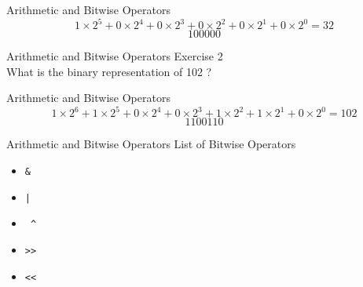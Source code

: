 \documentclass{beamer}
\begin{document}
    \begin{frame}{Arithmetic and Bitwise Operators}
        $$ 1 \times 2^5 + 0 \times 2^4 + 0 \times 2^3 + 0 \times 2^2 + 
        0 \times 2^1 + 0 \times 2^0 = 32 $$
        $$ 100000 $$
    \end{frame}
    
    \begin{frame}{Arithmetic and Bitwise Operators}
        \color{blue} \Large Exercise 2 \\
        \color{black} \normalsize \vskip 10pt
        What is the binary representation of 102 ?
    \end{frame}

    \begin{frame}{Arithmetic and Bitwise Operators}
        $$ 1 \times 2^6 + 1 \times 2^5 + 0 \times 2^4 + 
        0 \times 2^3 + 1 \times 2^2 + 1 \times 2^1 + 0 \times 2^0 = 102 $$
        $$ 1100110 $$
    \end{frame}
    
    \begin{frame}{Arithmetic and Bitwise Operators}
        \color{blue} \Large List of Bitwise Operators \\
        \color{black} \normalsize \vskip 10pt
        
        \begin{itemize}
            \item \texttt{\&}
            \item \texttt{|}
            \item \texttt{ \^}
            \item \texttt{>>}
            \item \texttt{<<}
        \end{itemize}
    \end{frame}
\end{document}

